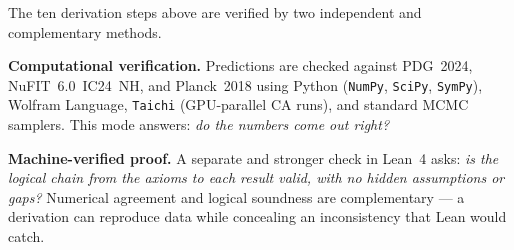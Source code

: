 \documentclass[11pt,openany]{book}
\theoremstyle{remark}
\begin{document}
\medskip

\noindent The ten derivation steps above are verified by two independent and complementary methods.

\medskip\noindent\textbf{Computational verification.}\quad
Predictions are checked against PDG~2024, NuFIT~6.0~IC24~NH, and Planck~2018
using Python (\texttt{NumPy}, \texttt{SciPy}, \texttt{SymPy}), Wolfram Language,
\texttt{Taichi} (GPU-parallel CA runs), and standard MCMC samplers.
This mode answers: \emph{do the numbers come out right?}

\medskip\noindent\textbf{Machine-verified proof.}\quad
A separate and stronger check in Lean~4 asks: \emph{is the logical chain from
the axioms to each result valid, with no hidden assumptions or gaps?}
Numerical agreement and logical soundness are complementary --- a derivation
can reproduce data while concealing an inconsistency that Lean would catch.
\end{document}
